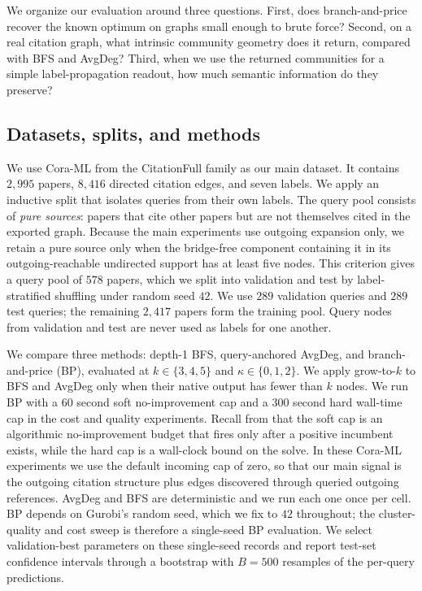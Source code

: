 \documentclass[12pt]{article}
\begin{document}
We organize our evaluation around three questions.  First, does branch-and-price recover the known optimum on graphs small enough to brute force?  Second, on a real citation graph, what intrinsic community geometry does it return, compared with BFS and AvgDeg?  Third, when we use the returned communities for a simple label-propagation readout, how much semantic information do they preserve?

\subsection{Datasets, splits, and methods}
\label{subsec:datasets-methods}

We use Cora-ML from the CitationFull family as our main dataset.  It contains $2{,}995$ papers, $8{,}416$ directed citation edges, and seven labels.  We apply an inductive split that isolates queries from their own labels.  The query pool consists of \emph{pure sources}: papers that cite other papers but are not themselves cited in the exported graph.  Because the main experiments use outgoing expansion only, we retain a pure source only when the bridge-free component containing it in its outgoing-reachable undirected support has at least five nodes.  This criterion gives a query pool of $578$ papers, which we split into validation and test by label-stratified shuffling under random seed $42$.  We use $289$ validation queries and $289$ test queries; the remaining $2{,}417$ papers form the training pool.  Query nodes from validation and test are never used as labels for one another.

We compare three methods: depth-1 BFS, query-anchored AvgDeg, and branch-and-price (BP), evaluated at $k\in\{3,4,5\}$ and $\kappa\in\{0,1,2\}$.  We apply grow-to-$k$ to BFS and AvgDeg only when their native output has fewer than $k$ nodes.  We run BP with a $60$ second soft no-improvement cap and a $300$ second hard wall-time cap in the cost and quality experiments.  Recall from  that the soft cap is an algorithmic no-improvement budget that fires only after a positive incumbent exists, while the hard cap is a wall-clock bound on the solve.  In these Cora-ML experiments we use the default incoming cap of zero, so that our main signal is the outgoing citation structure plus edges discovered through queried outgoing references.  AvgDeg and BFS are deterministic and we run each one once per cell.  BP depends on Gurobi's random seed, which we fix to $42$ throughout; the cluster-quality and cost sweep is therefore a single-seed BP evaluation.  We select validation-best parameters on these single-seed records and report test-set confidence intervals through a bootstrap with $B=500$ resamples of the per-query predictions.
\end{document}
